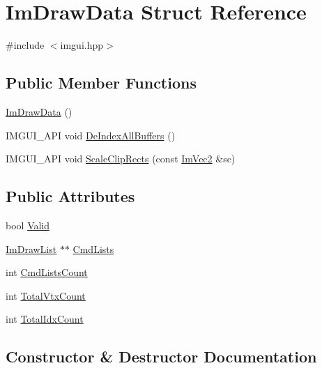 \hypertarget{struct_im_draw_data}{}\section{Im\+Draw\+Data Struct Reference}
\label{struct_im_draw_data}


{\ttfamily \#include $<$imgui.\+hpp$>$}

\subsection*{Public Member Functions}
\begin{DoxyCompactItemize}
\item 
\hyperlink{struct_im_draw_data_a96b50c40107c997e9eea7ac3ba1a6138}{Im\+Draw\+Data} ()
\item 
I\+M\+G\+U\+I\+\_\+\+A\+PI void \hyperlink{struct_im_draw_data_a88ae746e958b79ee527fe94dee29d57c}{De\+Index\+All\+Buffers} ()
\item 
I\+M\+G\+U\+I\+\_\+\+A\+PI void \hyperlink{struct_im_draw_data_abbfb7f8351b436da654f93b6f103f0e2}{Scale\+Clip\+Rects} (const \hyperlink{struct_im_vec2}{Im\+Vec2} \&sc)
\end{DoxyCompactItemize}
\subsection*{Public Attributes}
\begin{DoxyCompactItemize}
\item 
bool \hyperlink{struct_im_draw_data_ad01ab9ce5e8843b7860ccbb3eb9a6554}{Valid}
\item 
\hyperlink{struct_im_draw_list}{Im\+Draw\+List} $\ast$$\ast$ \hyperlink{struct_im_draw_data_a9e93fe7e620eb2e9f61e3b689d617edc}{Cmd\+Lists}
\item 
int \hyperlink{struct_im_draw_data_adc0bbc2881c15f78bdabe51d82582f4e}{Cmd\+Lists\+Count}
\item 
int \hyperlink{struct_im_draw_data_af0035b52cdf91932b25eaf2da853965a}{Total\+Vtx\+Count}
\item 
int \hyperlink{struct_im_draw_data_a1ac8a5d441f464628295ef91a0602fc5}{Total\+Idx\+Count}
\end{DoxyCompactItemize}


\subsection{Constructor \& Destructor Documentation}
\hypertarget{struct_im_draw_data_a96b50c40107c997e9eea7ac3ba1a6138}{}\label{struct_im_draw_data_a96b50c40107c997e9eea7ac3ba1a6138} 
